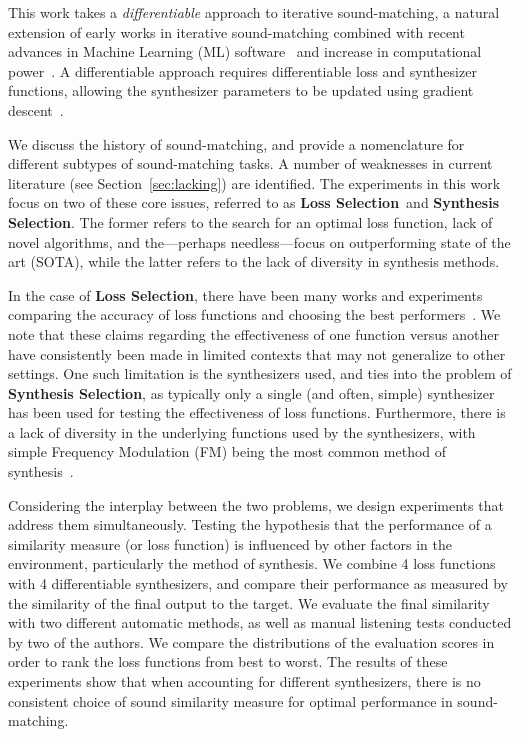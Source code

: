 \documentclass[lettersize,journal]{IEEEtran}
\providecommand{\gls}[1]{#1}
\newcommand{\LossSelect}{\textbf{Loss Selection}}
\newcommand{\SynthSelect}{\textbf{Synthesis Selection}}
\begin{document}
This work takes a \textit{differentiable} approach to iterative sound-matching, a natural extension of early works in iterative sound-matching combined with recent advances in Machine Learning (\gls{ML}) software~\cite{braun2024dac,paszke2019pytorch} and increase in computational power~\cite{moore2012introduction,schaller1997moore}. A differentiable approach requires differentiable loss and synthesizer functions, allowing the synthesizer parameters to be updated using gradient descent~\cite{goodfellow2016deep,boyd2004convex}.

We discuss the history of sound-matching, and provide a nomenclature for different subtypes of sound-matching tasks. A number of weaknesses in current literature (see Section~\ref{sec:lacking}) are identified. The experiments in this work focus on two of these core issues, referred to as \LossSelect~and \SynthSelect. The former refers to the search for an optimal loss function, lack of novel algorithms, and the---perhaps needless---focus on outperforming state of the art (\gls{SOTA}), while the latter refers to the lack of diversity in synthesis methods.

In the case of \LossSelect, there have been many works and experiments comparing the accuracy of loss functions and choosing the best performers~\cite{vahidi2023mesostructures,turian2020sorry,engel2020ddsp,uzrad2024diffmoog,han2023perceptual,masuda2021soundmatch,turian2020sorry,bruford2024synthesizer}. We note that these claims regarding the effectiveness of one function versus another have consistently been made in limited contexts that may not generalize to other settings. One such limitation is the synthesizers used, and ties into the problem of \SynthSelect, as typically only a single (and often, simple) synthesizer has been used for testing the effectiveness of loss functions. Furthermore, there is a lack of diversity in the underlying functions used by the synthesizers, with simple Frequency Modulation (\gls{FM}) being the most common method of synthesis~\cite{horner1993machine,vahidi2023mesostructures,mitchell2007evolutionary,caspe2023envelope}. 

Considering the interplay between the two problems, we design experiments that address them simultaneously. Testing the hypothesis that the performance of a similarity measure (or loss function) is influenced by other factors in the environment, particularly the method of synthesis. We combine 4 loss functions with 4 differentiable synthesizers, and compare their performance as measured by the similarity of the final output to the target. We evaluate the final similarity with two different automatic methods, as well as manual listening tests conducted by two of the authors. We compare the distributions of the evaluation scores in order to rank the loss functions from best to worst. The results of these experiments show that when accounting for different synthesizers, there is no consistent choice of sound similarity measure for optimal performance in sound-matching.
\end{document}
